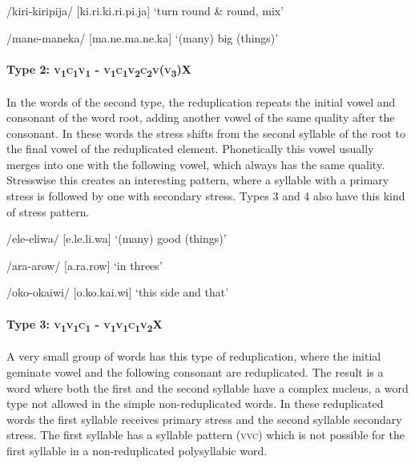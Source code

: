 /kiri-kiripija/  [ki.{{\textprimstress}}ri.ki.{{\textprimstress}}{{\textprimstress}}ri.pi.ja]  `turn round \& round, mix'

/mane-maneka/  [ma.{{\textprimstress}}ne.ma.{{\textprimstress}}{{\textprimstress}}ne.ka]  `(many) big (things)'

\paragraph[Type 2:  \textsc{v1c1v1} - \textsc{v1c1v2c2v(v3)x}]{Type 2:  \textsc{v}\textsubscript{1}\textsc{c}\textsubscript{1}\textsc{v}\textsubscript{1} - \textsc{v}\textsubscript{1}\textsc{c}\textsubscript{1}\textsc{v}\textsubscript{2}\textsc{c}\textsubscript{2}\textsc{v}(\textsc{v}\textsubscript{3})X}

In the words of the second type, the reduplication repeats the initial vowel and consonant of the word root, adding another vowel of the same quality after the consonant.  In these words the stress shifts from the second syllable of the root to the final vowel of the reduplicated element.  Phonetically this vowel usually merges into one with the following vowel, which always has the same quality.  Stresswise this creates an interesting pattern, where a syllable with a primary stress is followed by one with secondary stress.  Types 3 and 4 also have this kind of stress pattern.

/ele-eliwa/  [e.{{\textprimstress}}le.{{\textprimstress}}{{\textprimstress}}li.wa]  `(many) good (things)'

/ara-arow/  [a.{{\textprimstress}}ra.{{\textprimstress}}{{\textprimstress}}row]  `in threes'

/oko-okaiwi/  [o.{{\textprimstress}}ko.{{\textprimstress}}{{\textprimstress}}kai.wi]  `this side and that'

\paragraph[Type 3:  \textsc{v1v1c1} - \textsc{v1v1c1v2X}]{Type 3:  \textsc{v}\textsubscript{1}\textsc{v}\textsubscript{1}\textsc{c}\textsubscript{1} - \textsc{v}\textsubscript{1}\textsc{v}\textsubscript{1}\textsc{c}\textsubscript{1}\textsc{v}\textsubscript{2}X}

A very small group of words has this type of reduplication, where the initial geminate vowel and the following consonant are reduplicated.  The result is a word where both the first and the second syllable have a complex nucleus, a word type not allowed in the simple non-reduplicated words.  In these reduplicated words the first syllable receives primary stress and the second syllable secondary stress.  The first syllable has a syllable pattern (\textsc{vvc}) which is not possible for the first syllable in a non-reduplicated polysyllabic word.

